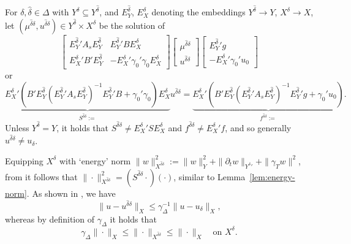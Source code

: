 \documentclass[11pt,a4paper,oneside,english]{amsart}
\numberwithin{equation}{section}
\numberwithin{theorem}{section}
\theoremstyle{definition}
\newcommand{\rvv}[1]{{\color{teal}{RvV: #1}}}
\begin{document}
For $\delta, \hat{\delta} \in \Delta$ with $Y^\delta \subseteq Y^{\hat{\delta}}$, and 
$E_Y^{\hat{\delta}}$, $E_X^\delta$ denoting the embeddings $Y^{\hat{\delta}} \rightarrow Y$,
$X^\delta \rightarrow X$, let $(\mu^{\hat{\delta} \delta},u^{\hat{\delta} \delta}) \in Y^{\hat{\delta}} \times X^\delta$ be the solution of 
\[
  \begin{bmatrix}{E_Y^{\hat{\delta}}}' A_s E_Y^{\hat{\delta}}& {E_Y^{\hat{\delta}}}' B E^\delta_X\\ {E^\delta_X}' B' E_Y^{\hat{\delta}}& -{E^\delta_X}' \gamma_0' \gamma_0 E^\delta_X \end{bmatrix}
  \begin{bmatrix} \mu^{\hat{\delta} \delta} \\ u^{\hat{\delta} \delta} \end{bmatrix}
  \begin{bmatrix} {E^{\hat{\delta}}_Y}' g \\ -{E^\delta_X}' \gamma_0' u_0 \end{bmatrix}
\]
or
\begin{equation}
  \label{eqn:discr-schur}
  \underbrace{
    {E^\delta_X}'(B' E^{\hat{\delta}}_Y({E^{\hat{\delta}}_Y}' A_s E^{\hat{\delta}}_Y)^{-1} {E^{\hat{\delta}}_Y}' B +\gamma_0'\gamma_0)E^\delta_X
  }_{S^{\hat{\delta} \delta}:=}u^{\hat{\delta} \delta}
  =
  \underbrace{
    {E^\delta_X}' (B' E^{\hat{\delta}}_Y({E^{\hat{\delta}}_Y}' A_s E^{\hat{\delta}}_Y)^{-1} {E^{\hat{\delta}}_Y}' g+\gamma_0' u_0)
  }_{f^{\hat{\delta} \delta}:=}.
\end{equation}\rvv{heavy notatie uitstellen?}
Unless $Y^{\hat{\delta}}=Y$, it holds that $S^{\hat{\delta} \delta} \neq {E_X^\delta}' S E_X^\delta$ and $f^{\hat{\delta} \delta} \neq {E_X^\delta}'f$, and so generally $u^{\hat{\delta} \delta} \neq u_\delta$.

Equipping $X^\delta$ with `energy' norm $\|w\|^2_{X^{\hat{\delta}\delta}}:=\|w\|^2_{Y}+ \|\partial_t w\|_{{Y^\delta}'}+\|\gamma_T w\|^2$,
from \cite[Lemma~3.4]{Stevenson2020a} it follows that
$\|\cdot\|_{X^{\hat{\delta}\delta}}^2=(S^{\hat{\delta}\delta}\cdot)(\cdot)$,
similar to Lemma~\ref{lem:energy-norm}. As shown in \cite[Thm.~3.7]{Stevenson2020a}, we have
\begin{equation}
  \label{eqn:galerkin-ortho}
  \|u-u^{\hat{\delta}\delta}\|_X \leq \gamma_\Delta^{-1} \|u-u_\delta\|_X,
\end{equation}
whereas by definition of $\gamma_\Delta$ it holds that
\begin{equation}
  \label{eqn:X-norm-equiv}
  \gamma_\Delta\|\cdot\|_{X} \leq \|\cdot\|_{X^{\hat{\delta}\delta}} \leq \|\cdot\|_{X} \quad\text{on } X^\delta.
\end{equation}
\end{document}
